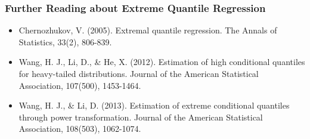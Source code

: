 \documentclass{beamer}
\begin{document}
\begin{frame}
    \frametitle{Further Reading about Extreme Quantile Regression}
    \begin{itemize}
        \item Chernozhukov, V. (2005). Extremal quantile regression. The Annals of Statistics, 33(2), 806-839.
        \item Wang, H. J., Li, D., \& He, X. (2012). Estimation of high conditional quantiles for heavy-tailed distributions. Journal of the American Statistical Association, 107(500), 1453-1464.
        \item Wang, H. J., \& Li, D. (2013). Estimation of extreme conditional quantiles through power transformation. Journal of the American Statistical Association, 108(503), 1062-1074.
    \end{itemize}
\end{frame}
\end{document}
